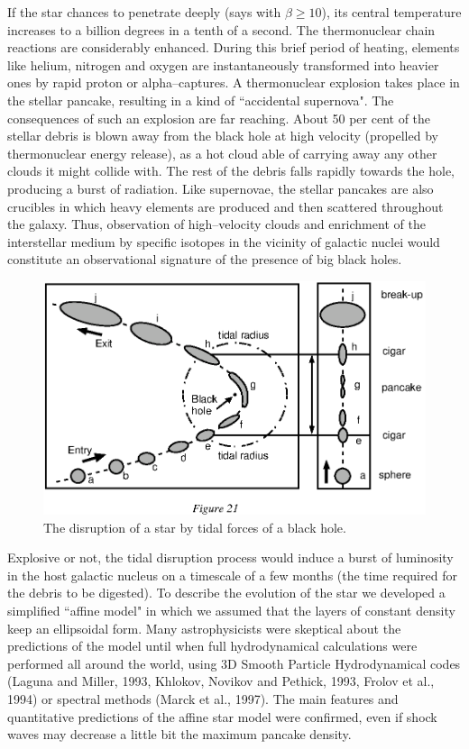 \documentclass{lamuphys}
\begin{document}
If the star chances to penetrate deeply (says with $\beta \geq 10$), 
its central temperature increases to a billion degrees in a tenth of a 
second. The thermonuclear chain reactions are considerably enhanced. 
During this brief period of heating, elements like helium, nitrogen and 
oxygen are instantaneously transformed into heavier ones by rapid 
proton or alpha--captures. A thermonuclear explosion 
takes place in the stellar pancake, resulting in a kind of 
``accidental supernova". The consequences of such an explosion are far 
reaching. About 50 per cent of the stellar debris is blown away from 
the black hole at high velocity (propelled by thermonuclear energy 
release), as a hot cloud able of carrying away any other clouds it 
might collide with. The rest of the debris falls rapidly towards the 
hole, producing a burst of radiation. Like supernovae, the stellar 
pancakes are also crucibles in which heavy elements are produced and 
then scattered throughout the galaxy. Thus, 
observation of high--velocity clouds and enrichment of 
the interstellar medium by specific isotopes in the vicinity of galactic nuclei would 
constitute an observational signature of the presence of big black holes.

\begin{figure}[tb]
  \begin{center}
    \leavevmode
    \includegraphics{tidal.ps}
\caption{The disruption of a star by tidal forces of a black hole.}
  \end{center}
\end{figure}
Explosive or 
not, the tidal disruption process would induce a burst of luminosity 
in the host galactic nucleus on a timescale of a few months (the time required 
for the debris to be digested).
To describe the evolution of the star we developed a simplified 
``affine model" in which we assumed that the layers of constant 
density keep an ellipsoidal form. Many astrophysicists were skeptical 
about the predictions of the model until when full hydrodynamical calculations were 
performed all around the world, using 3D Smooth Particle 
Hydrodynamical codes (Laguna and Miller, 1993, Khlokov, Novikov and 
Pethick, 1993, Frolov et al., 1994) or spectral methods (Marck et 
al., 1997). The main features and quantitative predictions of the 
affine star model were confirmed, even if shock waves may decrease a 
little bit the maximum pancake density.
\end{document}
